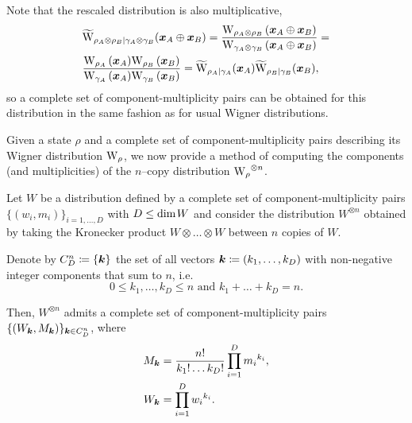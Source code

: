 Note that the rescaled distribution is also multiplicative,
\begin{align}
	&\widetilde{\rm{W}}_{\rho_A \otimes \rho_B | \gamma_A \otimes \gamma_B}(\bmx_A \oplus \bmx_B) = \frac{\W[\bmx_A \oplus \bmx_B]{\rho_A \otimes \rho_B}}{\W[\bmx_A \oplus \bmx_B]{\gamma_A \otimes \gamma_B}} = \nonumber \\
	&\frac{\W[\bmx_A]{\rho_A}\W[\bmx_B]{\rho_B}}{\W[\bmx_A]{\gamma_A}\W[\bmx_B]{\gamma_B}} = \widetilde{\rm{W}}_{\rho_A | \gamma_A}(\bmx_A)\widetilde{\rm{W}}_{\rho_B  | \gamma_B}(\bmx_B),
\end{align}
so a complete set of component-multiplicity pairs can be obtained for this distribution in the same fashion as for usual Wigner distributions.

Given a state $\rho$ and a complete set of component-multiplicity pairs describing its Wigner distribution $\W{\rho}$, we now provide a method of computing the components (and multiplicities) of the $n$--copy distribution $\W{\rho}^{\otimes n}$.
\begin{lemma}\label{lem:ncopycomponents}
	Let $W$ be a distribution defined by a complete set of component-multiplicity pairs $\{(w_i, m_i)\}_{i=1,\dots,D}$ with $D \leq {\rm{dim}}\hspace{1pt}W$ and consider the distribution $W^{\otimes n}$ obtained by taking the Kronecker product $W \otimes \dots \otimes W$ between $n$ copies of $W$.
	
	Denote by $C_D^n \coloneqq \{\bm{k}\}$ the set of all vectors $\bm{k} \coloneqq (k_1, \dots, k_D)$ with non-negative integer components that sum to $n$, i.e.
	\begin{equation*}
	0 \leq k_1, \dots, k_D \leq n \text{ and } k_1 + \dots + k_D = n.
	\end{equation*}
	
	Then, $W^{\otimes n}$ admits a complete set of component-multiplicity pairs $\{(W_{\bm{k}}, M_{\bm{k}})\}_{\bm{k} \in C_D^n}$, where
\begin{align}
	M_{\bm{k}} &= \frac{n!}{k_1!\dots k_D!} \prod\limits_{i=1}^D {m_i}^{k_i}, \label{eq:M}\\
	W_{\bm{k}} &= \prod\limits_{i=1}^D {w_i}^{k_i}. \label{eq:W}
\end{align}
\end{lemma}
